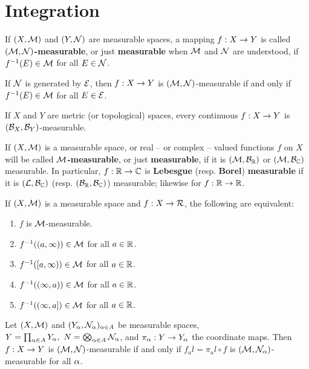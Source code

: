\newpage
\section{Integration}

\dfn If $(X, \mathcal{M})$ and $(Y,\mathcal{N})$ are measurable spaces, a mapping $f:X\rightarrow Y$ is called $(\mathcal{M}, \mathcal{N})$\textbf{-measurable}, or just \textbf{measurable} when $\mathcal{M}$ and $\mathcal{N}$ are understood, if $f^{-1}(E)\in \mathcal{M}$ for all $E\in \mathcal{N}$.

\vs

\begin{prop}
If $\mathcal{N}$ is generated by $\mathcal{E}$, then $f:X\rightarrow Y$ is $(\mathcal{M}, \mathcal{N})$-measurable if and only if $f^{-1}(E) \in \mathcal{M}$ for all $E\in \mathcal{E}$.
\end{prop}

\vs

\begin{cor}
If $X$ and $Y$ are metric (or topological) spaces, every continuous $f:X\rightarrow Y$ is $(\mathcal{B}_X, \mathcal{B}_Y)$-measurable.
\end{cor}

\vs

\dfn If $(X,\mathcal{M})$ is a measurable space, or real -- or complex -- valued functions $f$ on $X$ will be called $\mathcal{M}$\textbf{-measurable}, or just \textbf{measurable}, if it is $(\mathcal{M},\mathcal{B}_{\mathbb{R}})$ or $(\mathcal{M},\mathcal{B}_{\mathbb{C}})$ measurable. In particular, $f:\mathbb{R}\rightarrow \mathbb{C}$ is \textbf{Lebesgue} (resp. \textbf{Borel}) \textbf{measurable} if it is $(\mathcal{L}, \mathcal{B}_{\mathbb{C}})$ (resp. $(\mathcal{B}_{\mathbb{R}}, \mathcal{B}_{\mathbb{C}})$) measurable; likewise for $f:\mathbb{R}\rightarrow \mathbb{R}$.

\vs

\begin{prop}
If $(X,\mathcal{M})$ is a measurable space and $f:X\rightarrow\mathcal{R}$, the following are equivalent:
\begin{enumerate}[\hspace{1.4em}a.]
    \item $f$ is $\mathcal{M}$-measurable.
    \item $f^{-1}((a, \infty))\in \mathcal{M}$ for all $a\in \mathbb{R}$.
    \item $f^{-1}([a, \infty))\in \mathcal{M}$ for all $a\in \mathbb{R}$.
    \item $f^{-1}((\infty, a))\in \mathcal{M}$ for all $a\in \mathbb{R}$.
    \item $f^{-1}((\infty, a])\in \mathcal{M}$ for all $a\in \mathbb{R}$.
\end{enumerate}
\end{prop}

\vs

\begin{prop}
Let $(X, \mathcal{M})$ and $(Y_\alpha, \mathcal{N}_\alpha)_{\alpha\in A}$ be measurable spaces, $Y = \prod_{\alpha\in A}Y_\alpha,\ N = \bigotimes_{\alpha\in A} \mathcal{N}_\alpha$, and $\pi_\alpha:Y\rightarrow Y_\alpha$ the coordinate maps. Then $f:X\rightarrow Y$ is $(\mathcal{M}, \mathcal{N})$-measurable if and only if $f_al = \pi_al\circ f$ is $(\mathcal{M}, \mathcal{N}_\alpha)$-measurable for all $\alpha$.
\end{prop}

